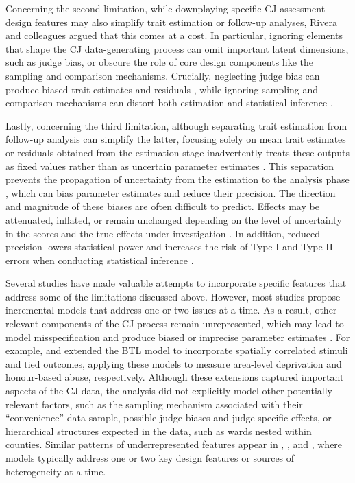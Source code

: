 \documentclass[
  authoryear,
  review,
  1p]{elsarticle}
\begin{document}
Concerning the second limitation, while downplaying specific CJ
assessment design features may also simplify trait estimation or
follow-up analyses, Rivera and colleagues
\citeyearpar{Rivera_et_al_2025} argued that this comes at a cost. In
particular, ignoring elements that shape the CJ data-generating process
can omit important latent dimensions, such as judge bias, or obscure the
role of core design components like the sampling and comparison
mechanisms. Crucially, neglecting judge bias can produce biased trait
estimates and residuals
\citep{Reckase_et_al_1986, Ackerman_1989, Kahraman_2013, Hoyle_et_al_2023},
while ignoring sampling and comparison mechanisms can distort both
estimation and statistical inference
\citetext{\citealp{Kohler_et_al_2019}; \citealp[chap.~15]{McElreath_2020}; \citealp{Schuessler_et_al_2023}}.

Lastly, concerning the third limitation, although separating trait
estimation from follow-up analysis can simplify the latter, focusing
solely on mean trait estimates or residuals obtained from the estimation
stage inadvertently treats these outputs as fixed values rather than as
uncertain parameter estimates \citep{McElreath_2020, Rivera_et_al_2025}.
This separation prevents the propagation of uncertainty from the
estimation to the analysis phase \citep{Pritikin_2020}, which can bias
parameter estimates and reduce their precision. The direction and
magnitude of these biases are often difficult to predict. Effects may be
attenuated, inflated, or remain unchanged depending on the level of
uncertainty in the scores and the true effects under investigation
\citep{McElreath_2020, Kline_et_al_2023, Hoyle_et_al_2023}. In addition,
reduced precision lowers statistical power and increases the risk of
Type I and Type II errors when conducting statistical inference
\citep{McElreath_2020}.

Several studies have made valuable attempts to incorporate specific
features that address some of the limitations discussed above. However,
most studies propose incremental models that address one or two issues
at a time. As a result, other relevant components of the CJ process
remain unrepresented, which may lead to model misspecification and
produce biased or imprecise parameter estimates
\citep{Everitt_et_al_2010}. For example, \citet{Seymour_et_al_2022} and
\citet{Seymour_et_al_2025} extended the BTL model to incorporate
spatially correlated stimuli and tied outcomes, applying these models to
measure area-level deprivation and honour-based abuse, respectively.
Although these extensions captured important aspects of the CJ data, the
analysis did not explicitly model other potentially relevant factors,
such as the sampling mechanism associated with their ``convenience''
data sample, possible judge biases and judge-specific effects, or
hierarchical structures expected in the data, such as wards nested
within counties. Similar patterns of underrepresented features appear in
\citet{Pritikin_2020}, \citet{Schramm_et_al_2021}, and
\citet{Gray_et_al_2024}, where models typically address one or two key
design features or sources of heterogeneity at a time.
\end{document}
